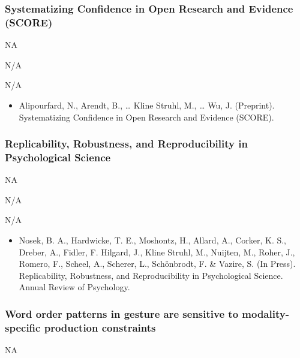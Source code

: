 \documentclass[
]{article}
\providecommand{\tightlist}{%
  \setlength{\itemsep}{0pt}\setlength{\parskip}{0pt}}
\begin{document}
\hypertarget{systematizing-confidence-in-open-research-and-evidence-score}{%
\subsubsection{Systematizing Confidence in Open Research and Evidence
(SCORE)}\label{systematizing-confidence-in-open-research-and-evidence-score}}

NA

N/A

N/A

\begin{itemize}
\tightlist
\item
  Alipourfard, N., Arendt, B., \ldots{} Kline Struhl, M., \ldots{} Wu,
  J. (Preprint). Systematizing Confidence in Open Research and Evidence
  (SCORE).
\end{itemize}

\hypertarget{replicability-robustness-and-reproducibility-in-psychological-science}{%
\subsubsection{Replicability, Robustness, and Reproducibility in
Psychological
Science}\label{replicability-robustness-and-reproducibility-in-psychological-science}}

NA

N/A

N/A

\begin{itemize}
\tightlist
\item
  Nosek, B. A., Hardwicke, T. E., Moshontz, H., Allard, A., Corker, K.
  S., Dreber, A., Fidler, F. Hilgard, J., Kline Struhl, M., Nuijten, M.,
  Roher, J., Romero, F., Scheel, A., Scherer, L., Schönbrodt, F. \&
  Vazire, S. (In Press). Replicability, Robustness, and Reproducibility
  in Psychological Science. Annual Review of Psychology.
\end{itemize}

\hypertarget{word-order-patterns-in-gesture-are-sensitive-to-modality-specific-production-constraints}{%
\subsubsection{Word order patterns in gesture are sensitive to
modality-specific production
constraints}\label{word-order-patterns-in-gesture-are-sensitive-to-modality-specific-production-constraints}}

NA
\end{document}
